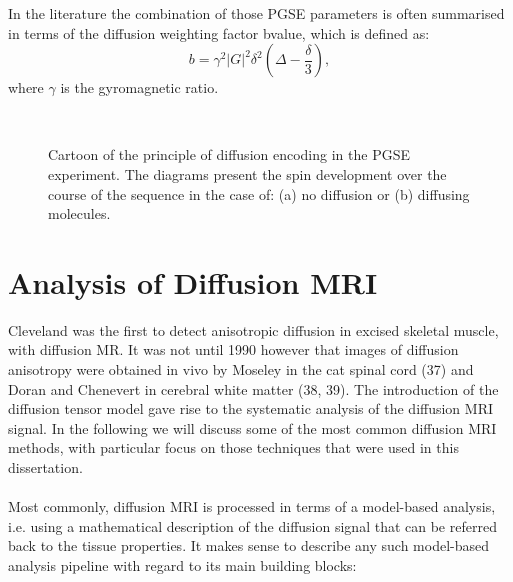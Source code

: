 In the literature the combination of those PGSE parameters is often summarised in terms of the diffusion weighting factor {\gls{bvalue}}, which is defined as:
\begin{equation}
	b = \gamma^2|G|^2\delta^2(\Delta-\frac{\delta}{3}),
    \label{eq:bvalue}
\end{equation}
where $\gamma$ is the gyromagnetic ratio.

\begin{figure}[H]
\centering
{}\\
\caption{Cartoon of the principle of diffusion encoding in the PGSE experiment. The diagrams present the spin development over the course of the sequence in the case of: (a) no diffusion or (b) diffusing molecules.}
\label{fig:chap2 diffusion illustration}
\end{figure}

\section{Analysis of Diffusion MRI}
Cleveland \citep{Cleveland:XXX} was the first to detect anisotropic diffusion in excised skeletal muscle, with diffusion MR. It was not until 1990 however that images of diffusion anisotropy were obtained in vivo by Moseley in the cat spinal cord (37) and Doran and Chenevert in cerebral white matter (38, 39). The introduction of the diffusion tensor model gave rise to the systematic analysis of the diffusion MRI signal. In the following we will discuss some of the most common diffusion MRI methods, with particular focus on those techniques that were used in this dissertation. 

\paragraph{}
Most commonly, diffusion MRI is processed in terms of a model-based analysis, i.e. using a mathematical description of the diffusion signal that can be referred back to the tissue properties. It makes sense to describe any such model-based analysis pipeline with regard to its main building blocks: 

